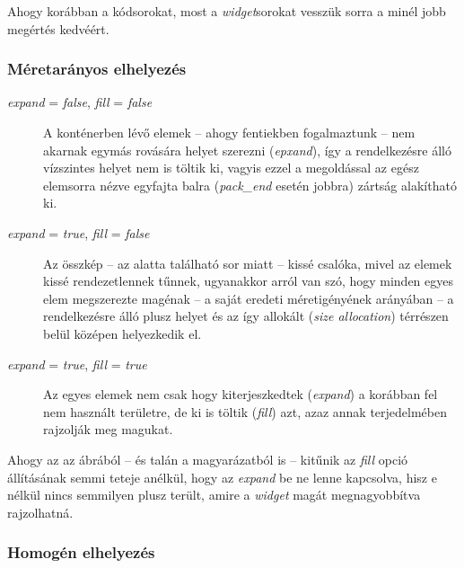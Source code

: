 \documentclass[a4paper,10pt]{article}
\begin{document}
Ahogy korábban a kódsorokat, most a \textit{widget}sorokat vesszük sorra a minél jobb megértés kedvéért.

\subsubsection{Méretarányos elhelyezés}

\begin{description}
 \item[\textit{expand} = \textit{false}, \textit{fill} = \textit{false}] A konténerben lévő elemek -- ahogy fentiekben fogalmaztunk -- nem akarnak egymás rovására helyet szerezni (\textit{epxand}), így a rendelkezésre álló vízszintes helyet nem is töltik ki, vagyis ezzel a megoldással az egész elemsorra nézve egyfajta balra (\textit{pack\_end} esetén jobbra) zártság alakítható ki.

 \item[\textit{expand} = \textit{true}, \textit{fill} = \textit{false}] Az összkép -- az alatta található sor miatt -- kissé csalóka, mivel az elemek kissé rendezetlennek tűnnek, ugyanakkor arról van szó, hogy minden egyes elem megszerezte magénak -- a saját eredeti méretigényének arányában -- a rendelkezésre álló plusz helyet és az így allokált (\textit{size allocation}) térrészen belül középen helyezkedik el.

 \item[\textit{expand} = \textit{true}, \textit{fill} = \textit{true}] Az egyes elemek nem csak hogy kiterjeszkedtek (\textit{expand}) a korábban fel nem használt területre, de ki is töltik (\textit{fill}) azt, azaz annak terjedelmében rajzolják meg magukat.
\end{description}

Ahogy az az ábrából -- és talán a magyarázatból is -- kitűnik az \textit{fill} opció állításának semmi teteje anélkül, hogy az \textit{expand} be ne lenne kapcsolva, hisz e nélkül nincs semmilyen plusz terült, amire a \textit{widget} magát megnagyobbítva rajzolhatná.

\subsubsection{Homogén elhelyezés}
\end{document}
